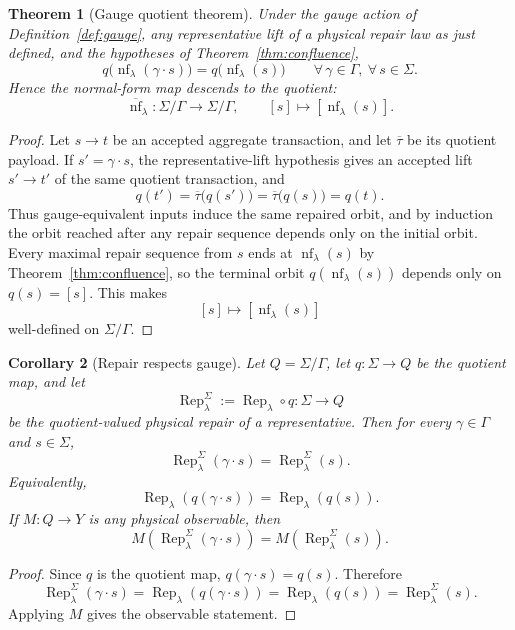 \documentclass[11pt]{article}
\newtheorem{theorem}{Theorem}[section]
\newtheorem{corollary}[theorem]{Corollary}
\theoremstyle{remark}
\theoremstyle{plain}
\begin{document}
\begin{theorem}[Gauge quotient theorem]\label{thm:gauge}
Under the gauge action of Definition~\ref{def:gauge}, any representative lift of a physical repair
law as just defined, and the hypotheses of Theorem~\ref{thm:confluence},
\[
q\bigl(\operatorname{nf}_\lambda(\gamma\cdot s)\bigr)
=
q\bigl(\operatorname{nf}_\lambda(s)\bigr)
\qquad
\forall\, \gamma\in\Gamma,\ \forall\, s\in\Sigma.
\]
Hence the normal-form map descends to the quotient:
\[
\overline{\operatorname{nf}}_\lambda:\Sigma/\Gamma \to \Sigma/\Gamma,
\qquad
[s]\mapsto [\operatorname{nf}_\lambda(s)].
\]
\end{theorem}

\begin{proof}
Let \(s\to t\) be an accepted aggregate transaction, and let \(\overline\tau\) be its quotient
payload. If \(s'=\gamma\cdot s\), the representative-lift hypothesis gives an accepted lift
\(s'\to t'\) of the same quotient transaction, and
\[
q(t')
=
\overline\tau\bigl(q(s')\bigr)
=
\overline\tau\bigl(q(s)\bigr)
=
q(t).
\]
Thus gauge-equivalent inputs induce the same repaired orbit, and by induction the orbit reached
after any repair sequence depends only on the initial orbit. Every maximal repair sequence from
$s$ ends at $\operatorname{nf}_\lambda(s)$ by Theorem~\ref{thm:confluence}, so the terminal orbit
$q(\operatorname{nf}_\lambda(s))$ depends only on $q(s)=[s]$. This makes
\[
[s]\longmapsto [\operatorname{nf}_\lambda(s)]
\]
well-defined on $\Sigma/\Gamma$.
\end{proof}

\begin{corollary}[Repair respects gauge]\label{cor:repair-respects-gauge}
Let \(Q=\Sigma/\Gamma\), let \(q:\Sigma\to Q\) be the quotient map, and let
\[
\operatorname{Rep}^{\Sigma}_\lambda
:=
\operatorname{Rep}_\lambda\circ q
:
\Sigma\to Q
\]
be the quotient-valued physical repair of a representative.  Then for every
\(\gamma\in\Gamma\) and \(s\in\Sigma\),
\[
\operatorname{Rep}^{\Sigma}_\lambda(\gamma\cdot s)
=
\operatorname{Rep}^{\Sigma}_\lambda(s).
\]
Equivalently,
\[
\operatorname{Rep}_\lambda(q(\gamma\cdot s))
=
\operatorname{Rep}_\lambda(q(s)).
\]
If \(M:Q\to Y\) is any physical observable, then
\[
M(\operatorname{Rep}^{\Sigma}_\lambda(\gamma\cdot s))
=
M(\operatorname{Rep}^{\Sigma}_\lambda(s)).
\]
\end{corollary}

\begin{proof}
Since \(q\) is the quotient map, \(q(\gamma\cdot s)=q(s)\).  Therefore
\[
\operatorname{Rep}^{\Sigma}_\lambda(\gamma\cdot s)
=
\operatorname{Rep}_\lambda(q(\gamma\cdot s))
=
\operatorname{Rep}_\lambda(q(s))
=
\operatorname{Rep}^{\Sigma}_\lambda(s).
\]
Applying \(M\) gives the observable statement.
\end{proof}
\end{document}
